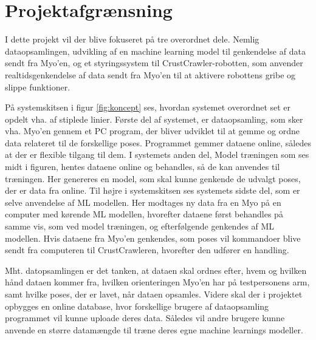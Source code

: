 \section{Projektafgrænsning}
I dette projekt vil der blive fokuseret på tre overordnet dele. Nemlig dataopsamlingen, udvikling af en machine learning model til genkendelse af data sendt fra Myo’en, og et styringssystem til CrustCrawler-robotten, som anvender realtidsgenkendelse af data sendt fra Myo’en til at aktivere robottens gribe og slippe funktioner. 


På systemskitsen i figur \ref{fig:koncept} ses, hvordan systemet overordnet set er opdelt vha. af stiplede linier. Første del af systemet, er dataopsamling, som sker vha. Myo’en gennem et PC program, der bliver udviklet til at gemme og ordne data relateret til de forskellige poses. Programmet gemmer dataene online, således at der er flexible tilgang til dem.
 I systemets anden del, Model træningen som ses midt i figuren, hentes dataene online og behandles, så de kan anvendes til træningen. Her genereres en model, som skal kunne genkende de udvalgt poses, der er data fra online. 
 Til højre i systemskitsen ses systemets sidste del, som er selve anvendelse af ML modellen. Her modtages ny data fra en Myo på en computer med kørende ML modellen, hvorefter dataene først behandles på samme vis, som ved model træningen, og efterfølgende genkendes af ML modellen. Hvis dataene fra Myo’en genkendes, som poses vil kommandoer blive sendt fra computeren til CrustCrawleren, hvorefter den udfører en handling.  

Mht. datopsamlingen er det tanken, at dataen skal ordnes efter, hvem og hvilken hånd dataen kommer fra, hvilken orienteringen Myo’en har på testpersonens arm, samt hvilke poses, der er lavet, når dataen opsamles. Videre skal der i projektet opbygges en online database, hvor forskellige brugere af dataopsamling programmet vil kunne uploade deres data. Således vil andre brugere kunne anvende en større datamængde til træne deres egne machine learnings modeller.


